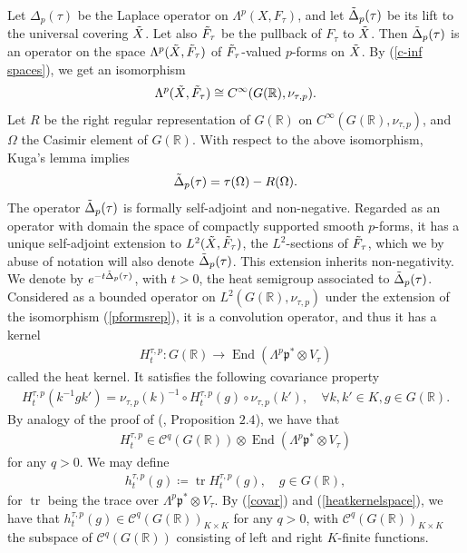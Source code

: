 \documentclass[11pt,reqno]{amsart}
\numberwithin{equation}{section}
\theoremstyle{definition}
\theoremstyle{remark}
\newcommand{\tr}{\operatorname{tr}}
\renewcommand{\tr}{\operatorname{tr}}
\newcommand{\End}{\operatorname{End}}
\newcommand{\mf}[1]{\mathfrak{#1}}
\newcommand{\R}{\mathbb{R}}
\begin{document}
Let $\Delta_p(\tau)$ be the Laplace operator on $\Lambda^p(X,F_\tau)$, and let $\Tilde{\Delta}_p(\tau)$ be its lift to the universal covering $\Tilde{X}$. Let also $\Tilde{F}_\tau$ be the pullback of $F_\tau$ to $\Tilde{X}$. Then $\Tilde{\Delta}_p(\tau)$ is an operator on the space $\Lambda^p(\Tilde{X},\Tilde{F}_\tau)$ of $\Tilde{F}_\tau$-valued $p$-forms on $\Tilde{X}$. By (\ref{c-inf spaces}), we get an isomorphism
\begin{align}\label{pformsrep}
    \Lambda^p(\Tilde{X},\Tilde{F}_\tau)\cong C^\infty(G(\R),\nu_{\tau,p}).
\end{align}
Let $R$ be the right regular representation of $G(\R)$ on $C^\infty(G(\R),\nu_{\tau,p})$, and $\Omega$ the Casimir element of $G(\R)$. With respect to the above isomorphism, Kuga's lemma implies
\begin{align}\label{casimirglobal}
    \Tilde{\Delta}_p(\tau)=\tau(\Omega)-R(\Omega).
\end{align}
The operator $\Tilde{\Delta}_p(\tau)$ is formally self-adjoint and non-negative. Regarded as an operator with domain the space of compactly supported smooth $p$-forms, it has a unique self-adjoint extension to $L^2(\Tilde{X},\Tilde{F}_\tau)$, the $L^2$-sections of $\Tilde{F}_\tau$, which we by abuse of notation will also denote $\Tilde{\Delta}_p(\tau)$. This extension inherits non-negativity. We denote by $e^{-t\Tilde{\Delta}_p(\tau)}$, with $t>0$, the heat semigroup associated to $\Tilde{\Delta}_p(\tau)$. Considered as a bounded operator on $L^2(G(\R),\nu_{\tau,p})$ under the extension of the isomorphism (\ref{pformsrep}), it is a convolution operator, and thus it has a kernel
\begin{align*}
    H_t^{\tau,p}:G(\R)\to \End(\Lambda^p\mf{p}^*\otimes V_\tau)
\end{align*}
called the heat kernel. It satisfies the following covariance property
\begin{align}\label{covar}
    H_t^{\tau,p}(k^{-1}gk')=\nu_{\tau,p}(k)^{-1}\circ H_t^{\tau,p}(g)\circ \nu_{\tau,p}(k'), \quad \forall k,k'\in K, g\in G(\R).
\end{align}
By analogy of the proof of (\cite{BM}, Proposition $2.4$), we have that 
\begin{align}\label{heatkernelspace}
    H_t^{\tau,p}\in \mathcal{C}^q(G(\R))\otimes \End(\Lambda^p\mf{p}^*\otimes V_\tau)
\end{align} 
for any $q>0$. We may define
\begin{align}\label{trheat}
    h_t^{\tau,p}(g)\coloneqq \tr H_t^{\tau,p}(g), \quad g\in G(\R),
\end{align}
for $\tr$ being the trace over $\Lambda^p\mf{p}^*\otimes V_\tau$. By (\ref{covar}) and (\ref{heatkernelspace}), we have that $h_t^{\tau,p}(g)\in \mathcal{C}^q(G(\R))_{K\times K}$ for any $q>0$, with $\mathcal{C}^q(G(\R))_{K\times K}$ the subspace of $\mathcal{C}^q(G(\R))$ consisting of left and right $K$-finite functions. 
\end{document}
